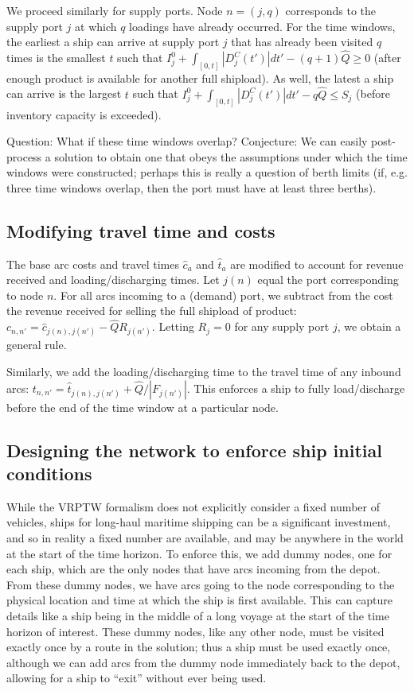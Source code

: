 \documentclass[11pt]{article}
\theoremstyle{definition}
\newcommand{\abs}[1]{\left| #1 \right|}
\newcommand{\0}{\mathbf{0}}
\renewcommand{\hat}{\widehat}
\begin{document}
We proceed similarly for supply ports.
Node $n = (j,q)$ corresponds to the supply port $j$ at which $q$ loadings have already occurred.
For the time windows, the earliest a ship can arrive at supply port $j$ that has already been visited $q$ times is the smallest $t$ such that
$I_j^0 + \int_{[0,t]} \abs{D_j^C(t')}dt' - (q+1)\hat{Q} \ge 0$
(after enough product is available for another full shipload).
As well, the latest a ship can arrive is the largest $t$ such that
$I_j^0 + \int_{[0,t]} \abs{D_j^C(t')}dt' - q\hat{Q} \le S_j$
(before inventory capacity is exceeded).


Question: What if these time windows overlap?
Conjecture: We can easily post-process a solution to obtain one that obeys the assumptions under which the time windows were constructed;
perhaps this is really a question of berth limits
(if, e.g. three time windows overlap, then the port must have at least three berths).

\subsection{Modifying travel time and costs}

The base arc costs and travel times $\hat{c}_a$ and $\hat{t}_a$ are modified to account for revenue received and loading/discharging times.
Let $j(n)$ equal the port corresponding to node $n$.
For all arcs incoming to a (demand) port, we subtract from the cost the revenue received for selling the full shipload of product: 
${c}_{n,n'} = \hat{c}_{j(n),j(n')} - \hat{Q}R_{j(n')}$.
Letting $R_j = 0$ for any supply port $j$, we obtain a general rule.

Similarly, we add the loading/discharging time to the travel time of any inbound arcs:
${t}_{n,n'} = \hat{t}_{j(n),j(n')} + \hat{Q}/\abs{F_{j(n')}}$.
This enforces a ship to fully load/discharge before the end of the time window at a particular node.


\subsection{Designing the network to enforce ship initial conditions}

While the VRPTW formalism does not explicitly consider a fixed number of vehicles, ships for long-haul maritime shipping can be a significant investment, and so in reality a fixed number are available, and may be anywhere in the world at the start of the time horizon.
To enforce this, we add dummy nodes, one for each ship, which are the only nodes that have arcs incoming from the depot.
From these dummy nodes, we have arcs going to the node corresponding to the physical location and time at which the ship is first available.
This can capture details like a ship being in the middle of a long voyage at the start of the time horizon of interest.
These dummy nodes, like any other node, must be visited exactly once by a route in the solution;
thus a ship must be used exactly once, although we can add arcs from the dummy node immediately back to the depot, allowing for a ship to ``exit'' without ever being used.
\end{document}
